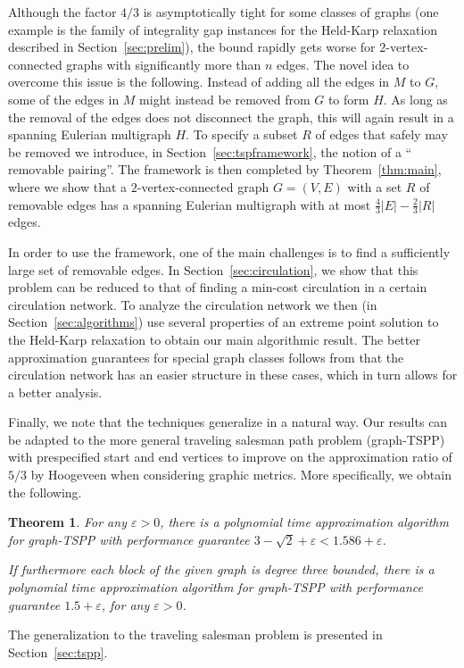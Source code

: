 \documentclass[letterpaper,11pt]{article}
\newtheorem{theorem}{Theorem}[section]
\newcommand{\MS}{\ensuremath{\mbox{removable pairing}}\xspace}
\newcommand{\HPP}{graph-TSPP\xspace}
\begin{document}
    Although the factor $4/3$ is asymptotically tight for some classes of
    graphs (one example is the family of integrality gap instances for the
    Held-Karp relaxation described in Section~\ref{sec:prelim}), the bound
    rapidly gets worse for $2$-vertex-connected graphs with significantly
    more than $n$ edges. The novel idea to overcome this issue is the
    following.  Instead of adding all the edges in $M$ to $G$, some of the
    edges in $M$ might instead be removed from $G$ to form $H$. As long as
    the removal of the edges does not disconnect the graph, this will
    again result in a spanning Eulerian multigraph $H$. To specify a
    subset $R$ of edges that safely may be removed we introduce, in
    Section~\ref{sec:tspframework}, the notion of a ``\MS''. The framework
    is then completed by Theorem~\ref{thm:main}, where we show that a
    $2$-vertex-connected graph $G=(V,E)$ with a set $R$ of removable edges
    has a spanning Eulerian multigraph with at most $\frac{4}{3} |E| - \frac{2}{3} |R|$
    edges.

    In order to use the framework, one of the main challenges is to find a
    sufficiently large set of removable edges. In
    Section~\ref{sec:circulation}, we show that this problem can be
    reduced to that of finding a min-cost circulation in a certain
    circulation network.  To analyze the circulation network we then (in
    Section~\ref{sec:algorithms}) use several properties of an extreme point solution to
    the Held-Karp relaxation to obtain our main algorithmic result. The
    better approximation guarantees for special graph classes follows from
    that the circulation network has an easier structure in these cases,
    which in turn allows for a better analysis.

    Finally, we note that the techniques generalize in a natural way. Our
    results can be adapted to the more general traveling salesman path
    problem (\HPP) with prespecified start and end vertices to improve on the
    approximation ratio of $5/3$ by Hoogeveen \cite{Hoo91} when
    considering graphic metrics. More specifically, we obtain the
    following.
    \begin{theorem}\label{thm:approximationratiohpp}
        For any $\varepsilon > 0$, there is a polynomial time approximation algorithm for
        \HPP with performance guarantee 
        $ 3-\sqrt{2}  + \varepsilon < 1.586+\varepsilon$.

        If furthermore each block of the given graph is degree three bounded, there is a
        polynomial time approximation algorithm for \HPP with performance
        guarantee $1.5 + \varepsilon$, for any $\varepsilon>0$.
    \end{theorem}
    The generalization to the traveling salesman problem is presented in
    Section~\ref{sec:tspp}.
\end{document}
